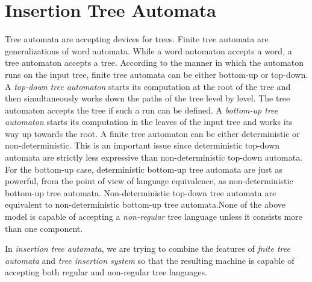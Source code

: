 
\section{Insertion Tree Automata}
Tree automata are accepting devices for trees.
Finite tree automata are generalizations of word automata. While a word automaton accepts
a word, a tree automaton accepts a tree. According to the manner in which the automaton 
runs on the input tree, finite tree automata
can be either bottom-up or top-down. A \emph{top-down tree automaton} starts its computation at
the root of the tree and then simultaneously works down the paths of the tree level by level.
The tree automaton accepts the tree if such a run can be defined. A \emph{bottom-up tree automaton}
starts its computation in the leaves of the input tree and works its way up towards the root.
A finite tree automaton can be either deterministic or non-deterministic. This is an important
issue since deterministic top-down automata are strictly less expressive than non-deterministic
top-down automata. For the bottom-up case, deterministic bottom-up tree automata are just
as powerful, from the point of view of language equivalence, as non-deterministic bottom-up
tree automata. Non-deterministic top-down tree automata are equivalent to non-deterministic
bottom-up tree automata.None of the above model is capable of accepting a \emph{non-regular}
tree language unless it consists more than one component.

In \emph{insertion tree automata}, we are trying to combine the features of \emph{fnite tree automata}
and \emph{tree insertion system} so that the resulting machine is capable of accepting both regular
and non-regular tree languages.

